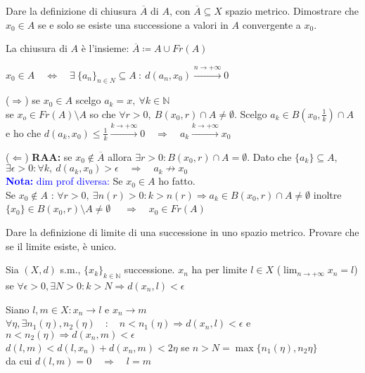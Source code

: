 \documentclass{exam}
\newcommand{\N}[0]{\mathbb{N}}
\newcommand{\nota}[1]{\textcolor{blue}{\textbf{Nota: }#1}}
\begin{document}
\begin{questions}
\question Dare la definizione di chiusura $\overline{A}$ di $A$, con $\overline{A} \subseteq X$ spazio metrico. Dimostrare che $x_0 \in A$ se e solo se esiste una successione a valori in $A$ convergente a $x_0$.
\begin{solution}
    La chiusura di $A$ è l'insieme: $\overline{A} \coloneqq A \cup Fr(A)$

    $x_0 \in A \quad\iff\quad \exists\  \{a_n\}_{n \in N} \subseteq A \ : \ d(a_n,x_0) \xrightarrow{n \rightarrow +\infty} 0$
    
    ($\Longrightarrow$) se $x_0 \in A$ scelgo $a_k = x ,\ \forall k\in\N$\\
    se $x_o \in Fr(A)\setminus A$ so che $\forall r>0,\  B(x_0,r)\cap A \not= \emptyset$. Scelgo $a_k \in B(x_0, \frac{1}{k})\cap A$ e ho che $d(a_k,x_0)\leq \frac{1}{k} \xrightarrow{k\rightarrow + \infty} 0 \quad\Longrightarrow\quad a_k \xrightarrow{k\rightarrow + \infty}x_0$
    
    
    ($\Longleftarrow$) \textbf{RAA:} se $x_0 \not\in \overline{A}$ allora $\exists r>0 : B(x_0, r) \cap A = \emptyset$. Dato che $\{a_k\} \subseteq A$, $\exists \epsilon > 0 : \forall k, \  d(a_k,x_0) >\epsilon \quad \Longrightarrow \quad a_k\not \longrightarrow x_0$\\
    \nota{dim prof diversa:}
    Se $x_0 \in A$ ho fatto.\\
    Se $x_0\not\in A$ : $\forall r>0,\ \exists n(r) >0 : k> n(r) \Rightarrow a_k \in B(x_0,r)\cap A \not= \emptyset $ inoltre $\{x_0\} \in B(x_0, r)\setminus A \not= \emptyset$ $\quad\Longrightarrow\quad x_0 \in Fr(A)$
\end{solution}

\question Dare la definizione di limite di una successione in uno spazio metrico. Provare che se il limite esiste, è unico.
\begin{solution}
    Sia $(X, d)$ s.m., $\{x_k\}_{k\in \N}$ successione. $x_n$ ha per limite $l\in X$ ($\lim_{n\rightarrow + \infty} x_n = l$) se $\forall \epsilon>0, \exists N>0 : k>N \Rightarrow d(x_n, l) < \epsilon$

    Siano $l,m \in X : x_n \rightarrow l$ e $x_n \rightarrow m$\\
    $\forall \eta, \exists n_1(\eta),n_2(\eta) \quad:\quad n< n_1(\eta) \Rightarrow  d(x_n,l) < \epsilon $ e $ n< n_2(\eta) \Rightarrow d(x_n,m)< \epsilon$\\
    $d(l,m) < d(l, x_n) + d(x_n, m) < 2\eta$ se $ n> N = \max\{n_1(\eta),n_2{\eta}\}$\\
    da cui $d(l,m) = 0  \quad\Longrightarrow \quad l=m$
\end{solution}


\end{questions}
\end{document}

